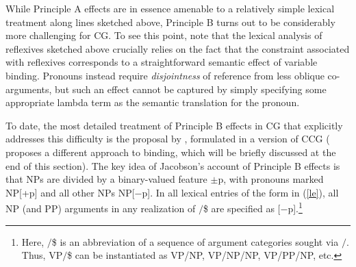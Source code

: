 \documentclass[output=paper,biblatex,babelshorthands,newtxmath,draftmode,colorlinks,citecolor=brown]{langscibook}
\begin{document}
While Principle A effects are in essence amenable to a 
relatively simple lexical treatment along lines sketched above, Principle B turns out to be
considerably more challenging for CG. To see this point, note that the
lexical analysis of reflexives sketched above crucially relies on the
fact that the constraint associated with reflexives corresponds to a
straightforward semantic effect of variable binding. Pronouns instead
require \emph{disjointness} of reference from less oblique co-arguments, but
such an effect cannot be captured by simply specifying some
appropriate lambda term as the semantic translation for the pronoun.

To date, the most detailed treatment of Principle B effects in CG that
explicitly addresses this difficulty is the proposal by
\citet{Jacobson07}, formulated in a version of CCG
(\citealt{Steedman97a} proposes a different approach to binding,
which will be briefly discussed at the end of this section). The key
idea of Jacobson's account of Principle B effects is that NPs are
divided by a binary-valued feature $\pm$p, with pronouns marked NP[+p]
and all other NPs NP[$-$p]. In all lexical entries of the form in
(\ref{le}), all NP (and PP) arguments in any realization of $/$\$ are
specified as [$-$p].\footnote{Here, $/$\$ is an abbreviation of a
  sequence of argument categories sought via $/$. Thus, VP$/$\$ can be
  instantiated as VP/NP, VP/NP/NP, VP/PP/NP, etc.}
\end{document}
